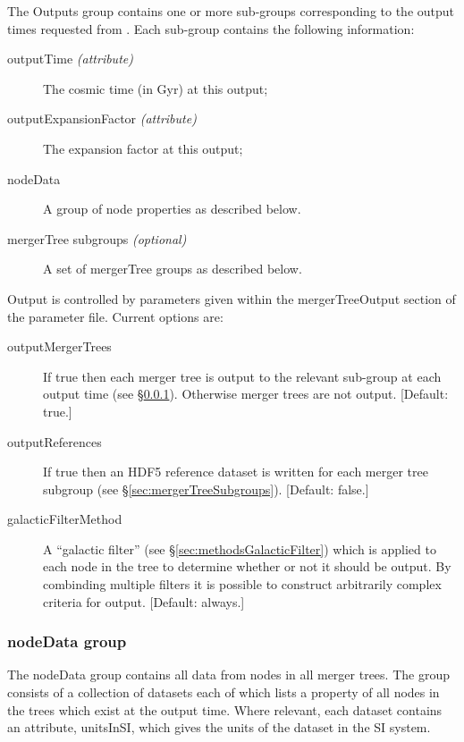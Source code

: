 The {\normalfont \ttfamily Outputs} group contains one or more sub-groups corresponding to the output times requested from \glc. Each sub-group contains the following information:
\begin{description}
 \item[{\normalfont \ttfamily outputTime} \emph{(attribute)}] The cosmic time (in Gyr) at this output;
 \item[{\normalfont \ttfamily outputExpansionFactor} \emph{(attribute)}] The expansion factor at this output;
 \item[{\normalfont \ttfamily nodeData}] A group of node properties as described below.
 \item[{\normalfont \ttfamily mergerTree} subgroups \emph{(optional)}] A set of {\normalfont \ttfamily mergerTree} groups as described below.
\end{description}

Output is controlled by parameters given within the {\normalfont \ttfamily mergerTreeOutput} section of the parameter file. Current options are:
\begin{description}
\item[{\normalfont \ttfamily outputMergerTrees}] If {\normalfont \ttfamily true} then each merger tree is output to the relevant sub-group at each output time (see \S\ref{sec:nodeDataGroup}). Otherwise merger trees are not output. [Default: {\normalfont \ttfamily true}.]
\item[{\normalfont \ttfamily outputReferences}] If {\normalfont \ttfamily true} then an HDF5 reference dataset is written for each merger tree subgroup (see \S\ref{sec:mergerTreeSubgroups}). [Default: {\normalfont \ttfamily false}.]
\item[{\normalfont \ttfamily galacticFilterMethod}] A ``galactic filter'' (see \S\ref{sec:methodsGalacticFilter}) which is applied to each node in the tree to determine whether or not it should be output. By combinding multiple filters it is possible to construct arbitrarily complex criteria for output. [Default: {\normalfont \ttfamily always}.]
\end{description}

\subsubsection{nodeData group}\label{sec:nodeDataGroup}

The {\normalfont \ttfamily nodeData} group contains all data from nodes in all merger trees. The group consists of a collection of datasets each of which lists a property of all nodes in the trees which exist at the output time. Where relevant, each dataset contains an attribute, {\normalfont \ttfamily unitsInSI}, which gives the units of the dataset in the SI system.

